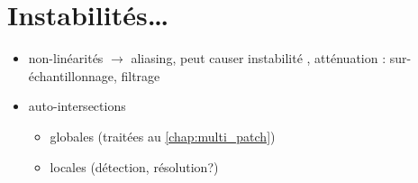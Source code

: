 \section{Instabilités\ldots}
\label{sec:instabilites}
\begin{itemize}
	\item non-linéarités $\to$ aliasing, peut causer instabilité \cite{rahimian2015}, atténuation : sur-échantillonnage, filtrage
	\item auto-intersections
	\begin{itemize}
		\item globales (traitées au \autoref{chap:multi_patch})
		\item locales \cite{farouki1986} (détection, résolution?)
	\end{itemize}
\end{itemize}
